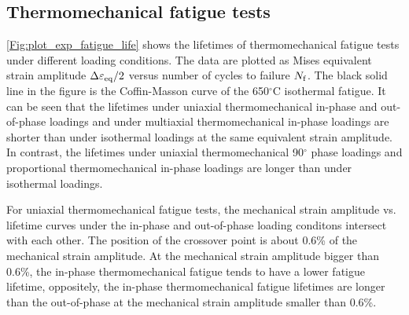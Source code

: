 \subsection{Thermomechanical fatigue tests}
\noindent
\ref{Fig:plot_exp_fatigue_life} shows the lifetimes of thermomechanical fatigue tests under different loading conditions. The data are plotted as Mises equivalent strain amplitude $\Delta\varepsilon_{\rm eq}/2$ versus number of cycles to failure $N_{\rm f}$. The black solid line in the figure is the Coffin-Masson curve of the 650$^\circ$C isothermal fatigue. It can be seen that the lifetimes under uniaxial thermomechanical in-phase and out-of-phase loadings and under multiaxial thermomechanical in-phase loadings are shorter than under isothermal loadings at the same equivalent strain amplitude.
In contrast, the lifetimes under uniaxial thermomechanical 90$^\circ$ phase loadings and proportional thermomechanical in-phase loadings are longer than under isothermal loadings.

For uniaxial thermomechanical fatigue tests, the mechanical strain amplitude vs. lifetime curves under the in-phase and out-of-phase loading conditons intersect with each other. The position of the crossover point is about 0.6\% of the mechanical strain amplitude.
At the mechanical strain amplitude bigger than 0.6\%, the in-phase thermomechanical fatigue tends to have a lower fatigue lifetime, oppositely, the in-phase thermomechanical fatigue lifetimes are longer than the out-of-phase at the mechanical strain amplitude smaller than 0.6\%.



